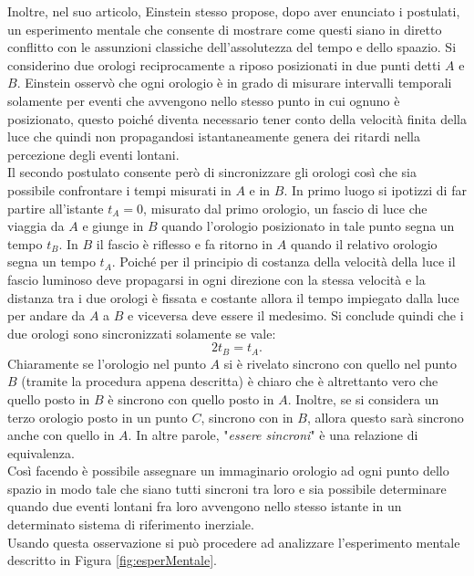 Inoltre, nel suo articolo, Einstein stesso propose, dopo aver enunciato i postulati, un esperimento mentale che consente di mostrare come questi siano in diretto conflitto con le assunzioni classiche dell'assolutezza del tempo e dello spaazio. Si considerino due orologi reciprocamente a riposo posizionati in due punti detti $A$ e $B$. Einstein osservò che ogni orologio è in grado di misurare intervalli temporali solamente per eventi che avvengono nello stesso punto in cui ognuno è posizionato, questo poiché diventa necessario tener conto della velocità finita della luce che quindi non propagandosi istantaneamente genera dei ritardi nella percezione degli eventi lontani.\\ Il secondo postulato consente però di sincronizzare gli orologi così che sia possibile confrontare i tempi misurati in $A$ e in $B$. In primo luogo si ipotizzi di far partire all'istante $t_A=0$, misurato dal primo orologio, un fascio di luce che viaggia da $A$ e giunge in $B$ quando l'orologio posizionato in tale punto segna un tempo $t_B$. In $B$ il fascio è riflesso e fa ritorno in $A$ quando il relativo orologio segna un tempo $t_A$. Poiché per il principio di costanza della velocità della luce il fascio luminoso deve propagarsi in ogni direzione con la stessa velocità e la distanza tra i due orologi è fissata e costante allora il tempo impiegato dalla luce per andare da $A$ a $B$ e viceversa deve essere il medesimo. Si conclude quindi che i due orologi sono sincronizzati solamente se vale:
\begin{equation}
    2t_B=t_A.
    \label{SinconizazioneOrologi}
\end{equation}
Chiaramente se l'orologio nel punto $A$ si è rivelato sincrono con quello nel punto $B$ (tramite la procedura appena descritta) è chiaro che è altrettanto vero che quello posto in $B$ è sincrono con quello posto in $A$. Inoltre, se si considera un terzo orologio posto in un punto $C$, sincrono con in $B$, allora questo sarà sincrono anche con quello in $A$. In altre parole, "\emph{essere sincroni}" è una relazione di equivalenza.\\Così facendo è possibile assegnare un immaginario orologio ad ogni punto dello spazio in modo tale che siano tutti sincroni tra loro e sia possibile determinare quando due eventi lontani fra loro avvengono nello stesso istante in un determinato sistema di riferimento inerziale.\\
Usando questa osservazione si può procedere ad analizzare l'esperimento mentale descritto in Figura \ref{fig:esperMentale}.
